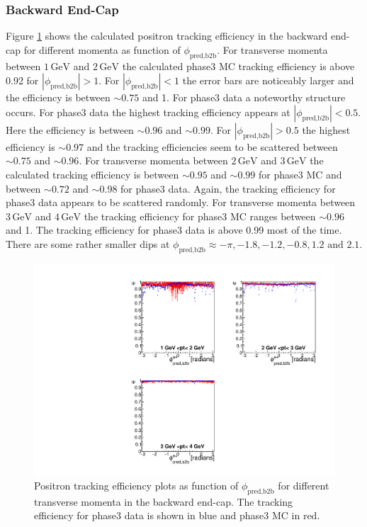 \documentclass[a4paper,11pt,twosided,final,german,openbib,pdftex,listof=totoc,bibliography=totoc]{scrbook}
\begin{document}
\clearpage

\subsubsection{Backward End-Cap}


Figure \ref{plt:xPtMPhiepEC3} shows the calculated positron tracking efficiency in the backward end-cap for different momenta as function of $\phi_{\textrm{pred,b2b}}$.
For transverse momenta between $1\,\textrm{GeV}$ and $2\,\textrm{GeV}$ the calculated phase3 MC tracking efficiency is above 0.92 for $|\phi_{\textrm{pred,b2b}}| >1$. For $|\phi_{\textrm{pred,b2b}}|<1$ the error bars are noticeably larger and the efficiency is between $\sim 0.75$ and 1. For phase3 data a noteworthy structure occurs. For phase3 data the highest tracking efficiency appears at $|\phi_{\textrm{pred,b2b}}| <0.5$. Here the efficiency is between $\sim 0.96$ and $\sim 0.99$. For $|\phi_{\textrm{pred,b2b}}| > 0.5$ the highest efficiency is $\sim 0.97$ and the tracking efficiencies seem to be scattered between $\sim 0.75$ and $\sim 0.96$.
For transverse momenta between $2\,\textrm{GeV}$ and $3\,\textrm{GeV}$ the calculated tracking efficiency is between $\sim 0.95$ and $\sim 0.99$ for phase3 MC and between $\sim 0.72$ and $\sim 0.98$ for phase3 data. Again, the tracking efficiency for phase3 data appears to be scattered randomly.
For transverse momenta between $3\,\textrm{GeV}$ and $4\,\textrm{GeV}$ the tracking efficiency for phase3 MC ranges between $\sim 0.96$ and 1. The tracking efficiency for phase3 data is above 0.99 most of the time. There are some rather smaller dips at $\phi_{\textrm{pred,b2b}} \approx -\pi, -1.8, -1.2, -0.8, 1.2 \textrm{ and } 2.1$.



\begin{figure}[!htbp]
	\centering
	\includegraphics[width=\textwidth]{Plots/master3/xPtMPhiepECP3}
	\caption[Transverse Momentum $\phi_{\textrm{pred,b2b}}$ Positron Backward End-Cap Efficiency Phase3]{Positron tracking efficiency plots as function of $\phi_{\textrm{pred,b2b}}$ for different transverse momenta in the backward end-cap. The tracking efficiency for phase3 data is shown in blue and phase3 MC in red.}
	
	\label{plt:xPtMPhiepEC3}
\end{figure}
\end{document}
